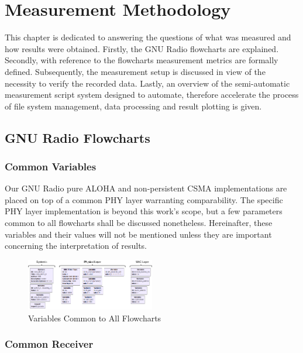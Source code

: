 \chapter{Measurement Methodology}

This chapter is dedicated to answering the questions of what was measured and how results were obtained. Firstly, the GNU Radio flowcharts are explained. Secondly, with reference to the flowcharts measurement metrics are formally defined. Subsequently, the measurement setup is discussed in view of the necessity to verify the recorded data. Lastly, an overview of the semi-automatic measurement script system designed to automate, therefore accelerate the process of file system management, data processing and result plotting is given.

\section{GNU Radio Flowcharts}

\subsection{Common Variables}

Our GNU Radio pure ALOHA and non-persistent CSMA implementations are placed on top of a common PHY layer warranting comparability. The specific PHY layer implementation is beyond this work's scope, but a few parameters common to all flowcharts shall be discussed nonetheless. Hereinafter, these variables and their values will not be mentioned unless they are important concerning the interpretation of results.

\begin{figure}[ht]
	\label{fig:grc-common-variables}
	\begin{center}
		\includegraphics[width=0.5\textwidth]{pictures/grc_common_variables}
	\end{center}
\caption{Variables Common to All Flowcharts}
\end{figure}     

\subsection{Common Receiver}

